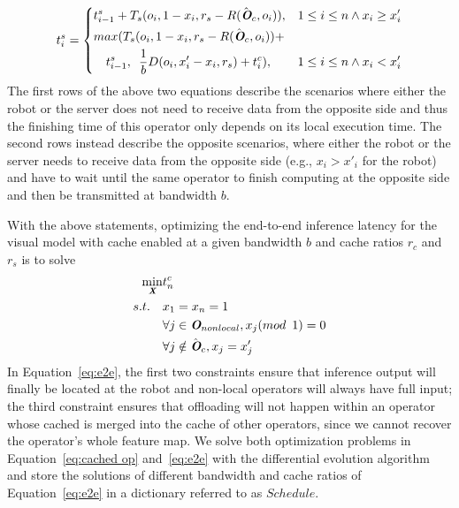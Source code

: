 \begin{equation*}
    t_i^{s} = \left\{
        \begin{aligned}
            &t_{i-1}^{s} + T_s(o_i, 1-x_i, r_s-R(\hat{\textit{\textbf{O}}}_c, o_i)),&&1\le i\le n \land x_i\ge x'_i \\
            &max(T_s(o_i, 1-x_i, r_s-R(\hat{\textit{\textbf{O}}}_c, o_i)) + \\
            & \enspace \enspace t_{i-1}^{s}, \enspace \frac{1}{b} D(o_i, x'_i-x_i,r_s)+ t_i^{c}),&&1\le i\le n \land x_i<x'_i
        \end{aligned}
    \right.
\end{equation*}
The first rows of the above two equations describe the scenarios where either the robot or the server does not need to receive data from the opposite side and thus the finishing time of this operator only depends on its local execution time.
The second rows instead describe the opposite scenarios, where either the robot or the server needs to receive data from the opposite side (e.g., $x_i > x'_i$ for the robot) and have to wait until the same operator to finish computing at the opposite side and then be transmitted at bandwidth $b$.

With the above statements, optimizing the end-to-end inference latency for the visual model with cache enabled at a given bandwidth $b$ and cache ratios $r_c$ and $r_s$ is to solve
\begin{equation}
    \begin{aligned}
        \min\limits_{\textit{\textbf{X}}} & t_n^{c} \\
         s.t. \enspace \enspace&  x_1 = x_n = 1 \\
         & \forall j \in \textit{\textbf{O}}_{nonlocal}, x_j (mod \enspace 1) = 0 \\
         & \forall j \notin \hat{\textit{\textbf{O}}}_c, x_j = x'_j
    \end{aligned}
    \label{eq:e2e}
\end{equation}
In Equation~\ref{eq:e2e}, the first two constraints ensure that inference output will finally be located at the robot and non-local operators will always have full input; the third constraint ensures that offloading will not happen within an operator whose cached is merged into the cache of other operators, since we cannot recover the operator's whole feature map.
We solve both optimization problems in Equation~\ref{eq:cached op} and~\ref{eq:e2e} with the differential evolution algorithm~\cite{qin2008differential} and store the solutions of different bandwidth and cache ratios of Equation~\ref{eq:e2e} in a dictionary referred to as $Schedule$.

